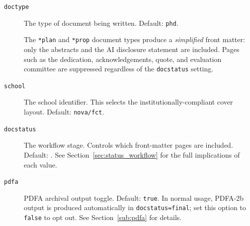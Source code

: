 \begin{description}
  \item[\texttt{doctype}] The type of document being written.
    Default: \texttt{phd}.
\begin{latexcode}
\end{latexcode}

    The \texttt{*plan} and \texttt{*prop} document types produce a
    \emph{simplified} front matter: only the abstracts and the AI disclosure
    statement are included.  Pages such as the dedication, acknowledgements,
    quote, and evaluation committee are suppressed regardless of the
    \texttt{docstatus} setting.

  \item[\texttt{school}] The school identifier.  This selects the
    institutionally-compliant cover layout.  Default: \texttt{nova/fct}.
\begin{latexcode}
\end{latexcode}

  \item[\texttt{docstatus}] The workflow stage.  Controls which front-matter
    pages are included.  Default: .  See
    Section~\ref{sec:status_workflow} for the full implications of each value.

\begin{latexcode}
\end{latexcode}

  \item[\texttt{pdfa}] \gls{PDFA} archival output toggle.  Default: \texttt{true}.
    In normal usage, \gls{PDFA}-2b output is produced automatically in
    \texttt{docstatus=final}; set this option to \texttt{false} to opt out.
    See Section~\ref{sub:pdfa} for details.
\begin{latexcode}
\end{latexcode}


\end{description}
